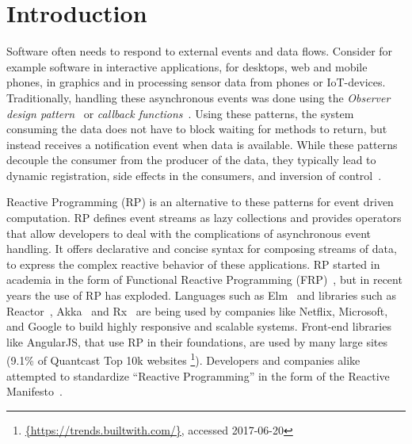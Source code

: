 \section{Introduction}

Software often needs to respond to external events and data flows.
Consider for example software in interactive applications, for desktops,
web and mobile phones, in graphics and in processing sensor data from
phones or IoT-devices.  Traditionally, handling these asynchronous
events was done using the \emph{Observer design pattern}~\cite{johnson1995design}
or \emph{callback functions}~\cite{gallaba2015don}.  Using these
patterns, the system consuming the data does not have to block waiting
for methods to return, but instead receives a notification event when
data is available.  While these patterns decouple the consumer from the
producer of the data, they typically lead to dynamic registration, side
effects in the consumers, and inversion of control~\cite{salvaneschi2014empirical,edwards2009coherent}.

Reactive Programming (RP) is an alternative to these patterns for event
driven computation.  RP defines event streams as lazy collections and
provides operators that allow developers to deal with the complications
of asynchronous event handling.  It offers declarative and concise
syntax for composing streams of data, to express the complex reactive
behavior of these applications.  RP started in academia in the form of
Functional Reactive Programming (FRP)~\cite{elliott1997functional,elliott2009push,czaplicki2013asynchronous,maier2010deprecating,meyerovich2009flapjax},
but in recent years the use of RP has exploded.  Languages such as Elm~\cite
{czaplicki2012elm} and libraries such as Reactor~\cite{Gutierrez2017},
Akka~\cite{klangakka} and Rx~\cite{meijer2010subject} are being used by
companies like Netflix, Microsoft, and Google to build highly responsive
and scalable systems.  Front-end libraries like AngularJS, that use RP
in their foundations, are used by many large sites (9.1\% of Quantcast
Top 10k websites%
\footnote{\url{{https://trends.builtwith.com/}}, accessed 2017-06-20}).
Developers and companies alike attempted to standardize ``Reactive
Programming'' in the form of the Reactive Manifesto~\cite{boner2014reactive}.

